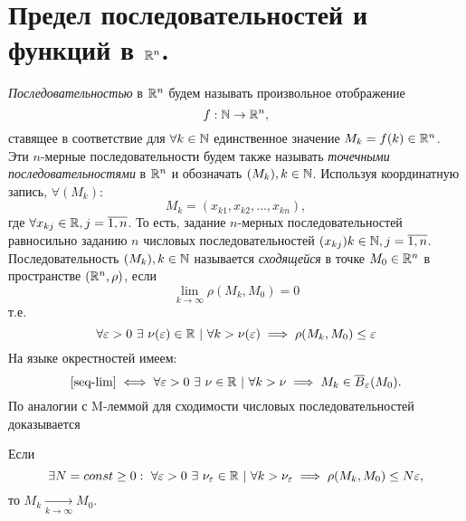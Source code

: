 \documentclass[../../main.tex]{subfiles}
\begin{document}
\section{Предел последовательностей и функций в $\mathbb{R}^n$.}

  \emph{Последовательностью} в $\mathbb{R}^n$ будем называть произвольное 
  отображение
  \[
    f : \mathbb{N} \to \mathbb{R}^n,
  \]
  ставящее в соответствие для $\forall k \in \mathbb{N}$ единственное 
  значение $M_k = f(k) \in \mathbb{R}^n$. 
  Эти $n$-мерные последовательности будем также называть 
  \emph{точечными последовательностями} в $\mathbb{R}^n$ и обозначать $
  (M_k), k \in \mathbb{N}$.
  Используя координатную запись, $\forall (M_k)$:
  \[
    M_k = (x_{k1}, x_{k2}, \dots, x_{kn}),
  \] 
  где $\forall x_{kj} \in \mathbb{R}, j = \overline{1, n}$.  
  То есть, задание $n$-мерных последовательностей равносильно 
  заданию $n$ числовых последовательностей $(x_{kj}) k \in \mathbb{N}, j = 
  \overline{1,n}$.
  Последовательность $(M_k), k \in \mathbb{N}$ называется \emph{сходящейся} 
  в точке $M_0 \in \mathbb{R}^n$ в пространстве $(\mathbb{R}^n, \rho)$, если
  \[
    \lim_{k \to \infty}{\rho(M_k, M_0)} = 0
  \]
  т.е. 
  \begin{equation}
  \label{seq-lim}
    \forall \varepsilon > 0\ \exists\ \nu(\varepsilon) \in \mathbb{R}\ |\ \forall k > 
    \nu(\varepsilon) \implies \rho(M_k, M_0) \leq \varepsilon 
  \end{equation}
  На языке окрестностей имеем:
  \[
    \eqref{seq-lim} \iff \forall \eps > 0\ \exists\ \nu \in \R\ |\ 
    \forall k > \nu  \implies M_k \in \overline B_\eps(M_0).
  \]
  По аналогии с M-леммой для сходимости числовых последовательностей 
  доказывается
  \begin{lem}
    Если 
    \[
      \exists N = const \geq 0:\ 
      \forall \eps > 0\ \exists\ \nu_\eps \in \R\ |\ \forall k > 
      \nu_\eps \implies \rho(M_k, M_0) \leq N \eps,
    \]
    то $M_k \underset{k\rightarrow\infty}{\longrightarrow}  M_0$.
  \end{lem}
\end{document}
